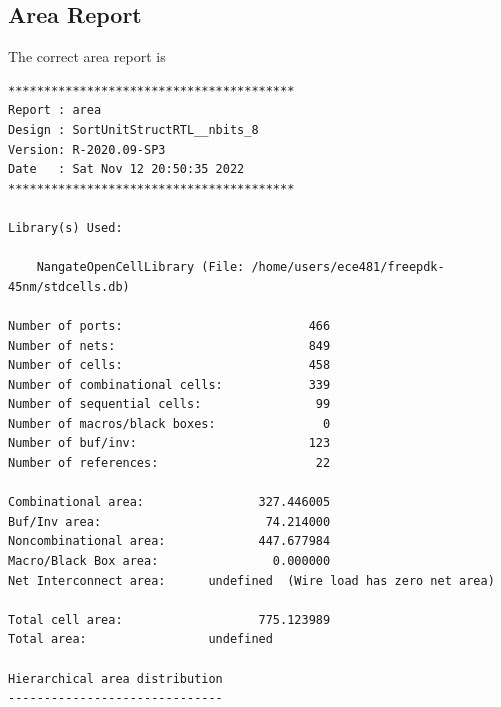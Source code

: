 \documentclass[a4paper,12pt,twoside]{article}
\begin{document}
\subsection{Area Report}
The correct area report is
\begin{verbatim}
****************************************
Report : area
Design : SortUnitStructRTL__nbits_8
Version: R-2020.09-SP3
Date   : Sat Nov 12 20:50:35 2022
****************************************

Library(s) Used:

    NangateOpenCellLibrary (File: /home/users/ece481/freepdk-45nm/stdcells.db)

Number of ports:                          466
Number of nets:                           849
Number of cells:                          458
Number of combinational cells:            339
Number of sequential cells:                99
Number of macros/black boxes:               0
Number of buf/inv:                        123
Number of references:                      22

Combinational area:                327.446005
Buf/Inv area:                       74.214000
Noncombinational area:             447.677984
Macro/Black Box area:                0.000000
Net Interconnect area:      undefined  (Wire load has zero net area)

Total cell area:                   775.123989
Total area:                 undefined

Hierarchical area distribution
------------------------------


\end{verbatim}
\end{document}

